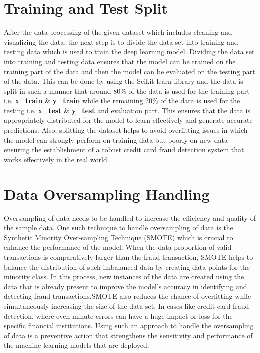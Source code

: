  \section{Training and Test Split}
 After the data processing of the given dataset which includes cleaning and visualizing the data, the next step is to divide the data set into training and testing data which is used to train the deep learning model. Dividing the data set into training and testing data ensures that the model can be trained on the training part of the data and then the model can be evaluated on the testing part of the data. This can be done by using the Scikit-learn library and the data is split in such a manner that around 80\% of the data is used for the training part i.e.\textbf{ x\_train }\& \textbf{y\_train }while the remaining 20\% of the data is used for the testing i.e. \textbf{x\_test }\&\textbf{ y\_test} and evaluation part. This ensures that the data is appropriately distributed for the model to learn effectively and generate accurate predictions. Also, splitting the dataset helps to avoid overfitting issues in which the model can strongly perform on training data but poorly on new data ensuring the establishment of a robust credit card fraud detection system that works effectively in the real world.


 \section{Data Oversampling Handling}
Oversampling of data needs to be handled to increase the efficiency and quality of the sample data. One such technique to handle oversampling of data is the Synthetic Minority Over-sampling Technique (SMOTE) which is crucial to enhance the performance of the model. When the data proportion of valid transactions is comparatively larger than the fraud transaction, SMOTE helps to balance the distribution of such imbalanced data by creating data points for the minority class. In this process, new instances of the data are created using the data that is already present to improve the model’s accuracy in identifying and detecting fraud transactions.SMOTE also reduces the chance of overfitting while simultaneously increasing the size of the data set. In cases like credit card fraud detection, where even minute errors can have a huge impact or loss for the specific financial institutions. Using such an approach to handle the oversampling of data is a preventive action that strengthens the sensitivity and performance of the machine learning models that are deployed.

